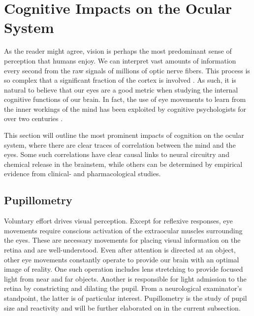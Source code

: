 \section{Cognitive Impacts on the Ocular System} \label{sec:bt/cognitive_impacts}

As the reader might agree, vision is perhaps the most predominant sense of perception that humans enjoy. We can interpret vast amounts of information every second from the raw signals of millions of optic nerve fibers. This process is so complex that a significant fraction of the cortex is involved \cite{klatzky2012}. As such, it is natural to believe that our eyes are a good metric when studying the internal cognitive functions of our brain. In fact, the use of eye movements to learn from the inner workings of the mind has been exploited by cognitive psychologists for over two centuries \cite{wells1792}. 

This section will outline the most prominent impacts of cognition on the ocular system, where there are clear traces of correlation between the mind and the eyes. Some such correlations have clear causal links to neural circuitry and chemical release in the brainstem, while others can be determined by empirical evidence from clinical- and pharmacological studies.


\subsection{Pupillometry} \label{sec:bt/cognitive_impacts/pupillometry}

Voluntary effort drives visual perception. Except for reflexive responses, eye movements require conscious activation of the extraocular muscles surrounding the eyes. These are necessary movements for placing visual information on the retina and are well-understood. Even after attention is directed at an object, other eye movements constantly operate to provide our brain with an optimal image of reality. One such operation includes lens stretching to provide focused light from near and far objects. Another is responsible for light admission to the retina by constricting and dilating the pupil. From a neurological examinator's standpoint, the latter is of particular interest. Pupillometry is the study of pupil size and reactivity and will be further elaborated on in the current subsection.

